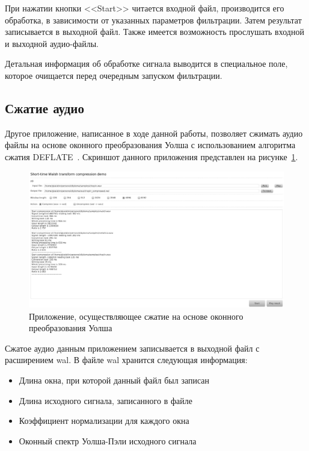 \documentclass{matmex-diploma-custom}
\begin{document}
При нажатии кнопки <<Start>> читается входной файл, производится 
его обработка, в зависимости от указанных параметров фильтрации.
Затем результат записывается в выходной файл. Также имеется возможность
прослушать входной и выходной аудио-файлы.

Детальная информация об обработке сигнала выводится в специальное
поле, которое очищается перед очередным запуском фильтрации.

\subsection{Сжатие аудио}
Другое приложение, написанное в ходе данной работы, позволяет
сжимать аудио файлы на основе оконного преобразования Уолша с использованием
алгоритма сжатия DEFLATE~\cite{deflate-spec}. Скриншот данного приложения
представлен на рисунке~\ref{pic:compressor-screenshot}.
\begin{figure}
    \centering
    \includegraphics[width=\textwidth, keepaspectratio=true]{../images/compressor-screen.png}
    \caption{Приложение, осуществляющее сжатие на основе оконного преобразования Уолша}
    \label{pic:compressor-screenshot}
\end{figure}

Сжатое аудио данным приложением записывается в выходной файл с расширением wal.
В файле wal хранится следующая информация:
\begin{itemize}
 \item Длина окна, при которой данный файл был записан
 \item Длина исходного сигнала, записанного в файле
 \item Коэффициент нормализации для каждого окна
 \item Оконный спектр Уолша-Пэли исходного сигнала
\end{itemize}
\end{document}
